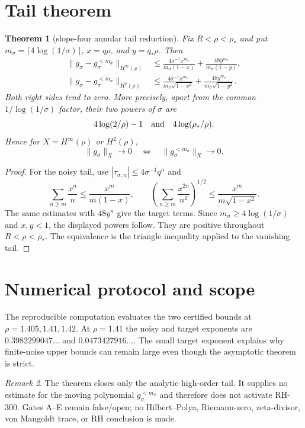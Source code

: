 \documentclass[11pt]{article}
\newtheorem{theorem}{Theorem}[section]
\theoremstyle{remark}\newtheorem{remark}[theorem]{Remark}
\begin{document}
\section{Tail theorem}
\begin{theorem}[slope-four annular tail reduction]\label{thm:tail}
Fix $R<\rho<\rho_*$ and put
$m_\sigma=\lceil4\log(1/\sigma)\rceil$,
$x=q\rho$, and $y=q_*\rho$.  Then
\begin{align*}
 \|g_\sigma-g_\sigma^{<m_\sigma}\|_{H^\infty(\rho)}
 &\le
 \frac{4\sigma^{-1}x^{m_\sigma}}
 {m_\sigma(1-x)}
 +\frac{48y^{m_\sigma}}
 {m_\sigma(1-y)},\\
 \|g_\sigma-g_\sigma^{<m_\sigma}\|_{H^2(\rho)}
 &\le
 \frac{4\sigma^{-1}x^{m_\sigma}}
 {m_\sigma\sqrt{1-x^2}}
 +\frac{48y^{m_\sigma}}
 {m_\sigma\sqrt{1-y^2}}.
\end{align*}
Both right sides tend to zero.  More precisely, apart from the common
$1/\log(1/\sigma)$ factor, their two powers of $\sigma$ are
\[
 4\log(2/\rho)-1
 \quad\hbox{and}\quad
 4\log(\rho_*/\rho).
\]
Hence for $X=H^\infty(\rho)$ or $H^2(\rho)$,
\[
 \|g_\sigma\|_X\longrightarrow0
 \quad\Longleftrightarrow\quad
 \|g_\sigma^{<m_\sigma}\|_X\longrightarrow0.
\]
\end{theorem}
\begin{proof}
For the noisy tail, use
$|\tau_{\sigma,n}|\le4\sigma^{-1}q^n$ and
\[
 \sum_{n\ge m}\frac{x^n}{n}
 \le\frac{x^m}{m(1-x)},\qquad
 \left(\sum_{n\ge m}\frac{x^{2n}}{n^2}\right)^{1/2}
 \le\frac{x^m}{m\sqrt{1-x^2}}.
\]
The same estimates with $48y^n$ give the target terms.  Since
$m_\sigma\ge4\log(1/\sigma)$ and $x,y<1$, the displayed powers follow.
They are positive throughout $R<\rho<\rho_*$.  The equivalence is the
triangle inequality applied to the vanishing tail.
\end{proof}

\section{Numerical protocol and scope}
The reproducible computation evaluates the two certified bounds at
$\rho=1.405,1.41,1.42$.  At $\rho=1.41$ the noisy and target exponents are
$0.3982299047\ldots$ and $0.0473427916\ldots$.  The small target exponent
explains why finite-noise upper bounds can remain large even though the
asymptotic theorem is strict.

\begin{remark}
The theorem closes only the analytic high-order tail.  It supplies no
estimate for the moving polynomial $g_\sigma^{<m_\sigma}$ and therefore does
not activate RH-300.  Gates A--E remain false/open; no Hilbert--Polya,
Riemann-zero, zeta-divisor, von Mangoldt trace, or RH conclusion is made.
\end{remark}
\end{document}
